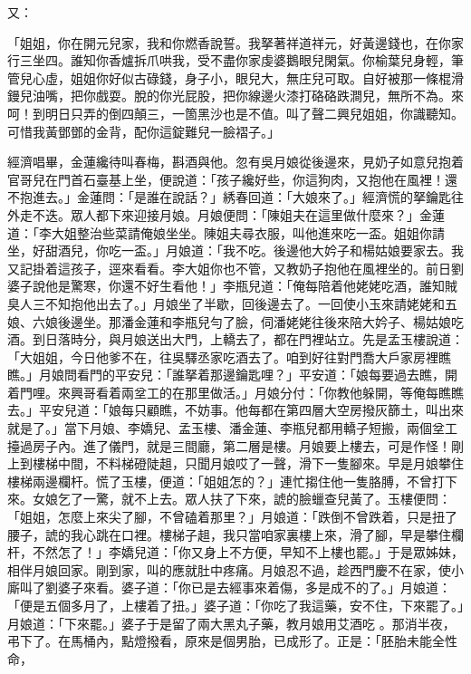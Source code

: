 又：

「姐姐，你在開元兒家，我和你燃香說誓。我拏著祥道祥元，好黃邊錢也，在你家行三坐四。誰知你香爐拆爪哄我，受不盡你家虔婆鵝眼兒閑氣。你榆葉兒身輕，筆管兒心虛，姐姐你好似古碌錢，身子小，眼兒大，無庄兒可取。自好被那一條棍滑鏝兒油嘴，把你戲耍。脫的你光屁股，把你線邊火漆打硌硌跌澗兒，無所不為。來呵！到明日只弄的倒四顛三，一箇黑沙也是不值。叫了聲二興兒姐姐，你識聽知。可惜我黃鄧鄧的金背，配你這錠難兒一臉褶子。」

經濟唱畢，金蓮纔待叫春梅，斟酒與他。忽有吳月娘從後邊來，見奶子如意兒抱着官哥兒在門首石臺基上坐，便說道：「孩子纔好些，你這狗肉，又抱他在風裡！還不抱進去。」金蓮問：「是誰在說話？」綉春回道：「大娘來了。」經濟慌的拏鑰匙往外走不迭。眾人都下來迎接月娘。月娘便問：「陳姐夫在這里做什麼來？」金蓮道：「李大姐整治些菜請俺娘坐坐。陳姐夫尋衣服，叫他進來吃一盃。姐姐你請坐，好甜酒兒，你吃一盃。」月娘道：「我不吃。後邊他大妗子和楊姑娘要家去。我又記掛着這孩子，逕來看看。李大姐你也不管，又教奶子抱他在風裡坐的。前日劉婆子說他是驚寒，你還不好生看他！」李瓶兒道：「俺每陪着他姥姥吃酒，誰知賊臭人三不知抱他出去了。」月娘坐了半歇，回後邊去了。一回使小玉來請姥姥和五娘、六娘後邊坐。那潘金蓮和李瓶兒勻了臉，伺潘姥姥往後來陪大妗子、楊姑娘吃酒。到日落時分，與月娘送出大門，上轎去了，都在門裡站立。先是孟玉樓說道：「大姐姐，今日他爹不在，往吳驛丞家吃酒去了。咱到好往對門喬大戶家房裡瞧瞧。」月娘問看門的平安兒：「誰拏着那邊鑰匙哩？」平安道：「娘每要過去瞧，開着門哩。來興哥看着兩坌工的在那里做活。」月娘分付：「你教他躲開，等俺每瞧瞧去。」平安兒道：「娘每只顧瞧，不妨事。他每都在第四層大空房撥灰篩土，叫出來就是了。」當下月娘、李嬌兒、孟玉樓、潘金蓮、李瓶兒都用轎子短搬，兩個坌工擡過房子內。進了儀門，就是三間廳，第二層是樓。月娘要上樓去，可是作怪！剛上到樓梯中間，不料梯磴陡趄，只聞月娘哎了一聲，滑下一隻腳來。早是月娘攀住樓梯兩邊欄杆。慌了玉樓，便道：「姐姐怎的？」連忙搊住他一隻胳膊，不曾打下來。女娘乞了一驚，就不上去。眾人扶了下來，諕的臉蠟查兒黃了。玉樓便問：「姐姐，怎麼上來尖了腳，不曾磕着那里？」月娘道：「跌倒不曾跌着，只是扭了腰子，諕的我心跳在口裡。樓梯子趄，我只當咱家裏樓上來，滑了腳，早是攀住欄杆，不然怎了！」李嬌兒道：「你又身上不方便，早知不上樓也罷。」于是眾姊妹，相伴月娘回家。剛到家，叫的應就肚中疼痛。月娘忍不過，趁西門慶不在家，使小廝叫了劉婆子來看。婆子道：「你已是去經事來着傷，多是成不的了。」月娘道：「便是五個多月了，上樓着了扭。」婆子道：「你吃了我這藥，安不住，下來罷了。」月娘道：「下來罷。」婆子于是留了兩大黑丸子藥，教月娘用艾酒吃 。那消半夜，弔下了。在馬桶內，點燈撥看，原來是個男胎，已成形了。正是：「胚胎未能全性命，  